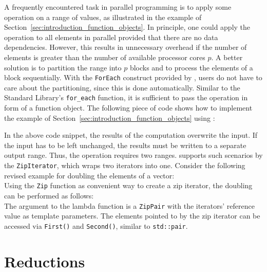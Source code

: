 A frequently encountered task in parallel programming is to apply some operation on a range of values, as illustrated in the example of Section~\ref{sec:introduction_function_objects}. In principle, one could apply the operation to all elements in parallel provided that there are no data dependencies. However, this results in unnecessary overhead if the number of elements is greater than the number of available processor cores $p$. A better solution is to partition the range into $p$ blocks and to process the elements of a block sequentially. With the \lstinline|ForEach| construct provided by \embb, users do not have to care about the partitioning, since this is done automatically. Similar to the Standard Library's \lstinline|for_each| function, it is sufficient to pass the operation in form of a function object. The following piece of code shows how to implement the example of Section~\ref{sec:introduction_function_objects} using \embb:
%
\\

In the above code snippet, the results of the computation overwrite the input. If the input has to be left unchanged, the results must be written to a separate output range. Thus, the operation requires two ranges. {\embb} supports such scenarios by the \lstinline|ZipIterator|, which wraps two iterators into one. Consider the following revised example for doubling the elements of a vector:
%
\\
%
Using the \lstinline|Zip| function as convenient way to create a zip iterator, the doubling can be performed as follows:
%
\\
%
The argument to the lambda function is a \lstinline|ZipPair| with the iterators' reference value as template parameters. The elements pointed to by the zip iterator can be accessed via \lstinline|First()| and \lstinline|Second()|, similar to \lstinline|std::pair|.

\section{Reductions}
\label{sec:algorithms_reductions}

